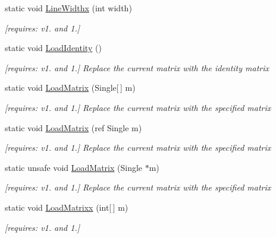 \begin{DoxyCompactItemize}
static void \hyperlink{class_open_t_k_1_1_graphics_1_1_e_s10_1_1_g_l_a0c7da29ac4828bd4a004def1d8eb4936}{Line\-Widthx} (int width)
\begin{DoxyCompactList}\small\item\em \mbox{[}requires\-: v1. and 1.\mbox{]}\end{DoxyCompactList}\item 
static void \hyperlink{class_open_t_k_1_1_graphics_1_1_e_s10_1_1_g_l_a08fd3426b0c8e96b8eb5d102a3dbce86}{Load\-Identity} ()
\begin{DoxyCompactList}\small\item\em \mbox{[}requires\-: v1. and 1.\mbox{]} Replace the current matrix with the identity matrix \end{DoxyCompactList}\item 
static void \hyperlink{class_open_t_k_1_1_graphics_1_1_e_s10_1_1_g_l_a146723b4f0b5fd145249072c832bac3d}{Load\-Matrix} (Single\mbox{[}$\,$\mbox{]} m)
\begin{DoxyCompactList}\small\item\em \mbox{[}requires\-: v1. and 1.\mbox{]} Replace the current matrix with the specified matrix \end{DoxyCompactList}\item 
static void \hyperlink{class_open_t_k_1_1_graphics_1_1_e_s10_1_1_g_l_a3a7e32985a5bb8608b206ae763c2528a}{Load\-Matrix} (ref Single m)
\begin{DoxyCompactList}\small\item\em \mbox{[}requires\-: v1. and 1.\mbox{]} Replace the current matrix with the specified matrix \end{DoxyCompactList}\item 
static unsafe void \hyperlink{class_open_t_k_1_1_graphics_1_1_e_s10_1_1_g_l_a55d751806603c4e2c44ebbb4fe3a80aa}{Load\-Matrix} (Single $\ast$m)
\begin{DoxyCompactList}\small\item\em \mbox{[}requires\-: v1. and 1.\mbox{]} Replace the current matrix with the specified matrix \end{DoxyCompactList}\item 
static void \hyperlink{class_open_t_k_1_1_graphics_1_1_e_s10_1_1_g_l_a348db5d1f1d9a38b55b6f2e444bfd798}{Load\-Matrixx} (int\mbox{[}$\,$\mbox{]} m)
\begin{DoxyCompactList}\small\item\em \mbox{[}requires\-: v1. and 1.\mbox{]}\end{DoxyCompactList}\item 

\end{DoxyCompactItemize}
